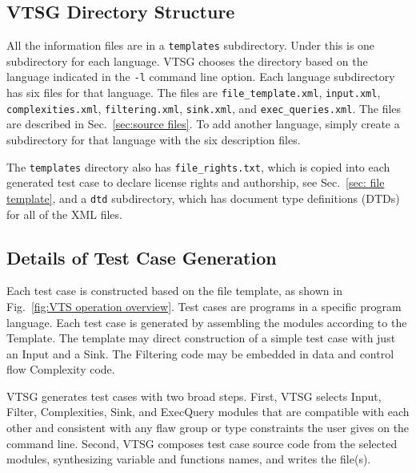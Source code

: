 \documentclass[12pt]{article}
\begin{document}
\subsection{VTSG Directory Structure}
\label{sec: directory structure}

All the information files are in a \verb|templates| subdirectory.
Under this is one subdirectory for each language.  VTSG chooses the
directory based on the language indicated in the \verb|-l| command line
option.  Each language subdirectory has six files for that language.
The files are \verb|file_template.xml|, \verb|input.xml|, 
\verb|complexities.xml|, \verb|filtering.xml|, \verb|sink.xml|,
and \verb|exec_queries.xml|.
The files are described in Sec.~\ref{sec:source files}.
To add another language,
simply create a subdirectory for that language with the six description
files.

The \verb|templates| directory also has \verb|file_rights.txt|, which is
copied into each generated test case to declare license rights and
authorship, see Sec.~\ref{sec: file template}, and a 
\verb|dtd| subdirectory, which has document type definitions (DTDs)
for all of the XML files.


\subsection{Details of Test Case Generation}
\label{sec: generation detail}

Each test case is constructed based on the file template, as shown
in Fig.~\ref{fig:VTS operation overview}. Test cases are 
programs in a specific program language.  
Each test case is generated by
assembling the modules according to the Template.  The
template may direct construction of a simple test case with just
an Input and a Sink.
The Filtering code may be embedded in data and control flow
Complexity code.

VTSG generates test cases with two broad steps.  First, VTSG selects
Input, Filter, Complexities, Sink, and ExecQuery modules that are
compatible with each other and consistent with any flaw group or
type constraints the user gives on the command line.  Second, VTSG
composes test case source code from the selected modules, 
synthesizing variable and functions names, and writes the file(s).
\end{document}
